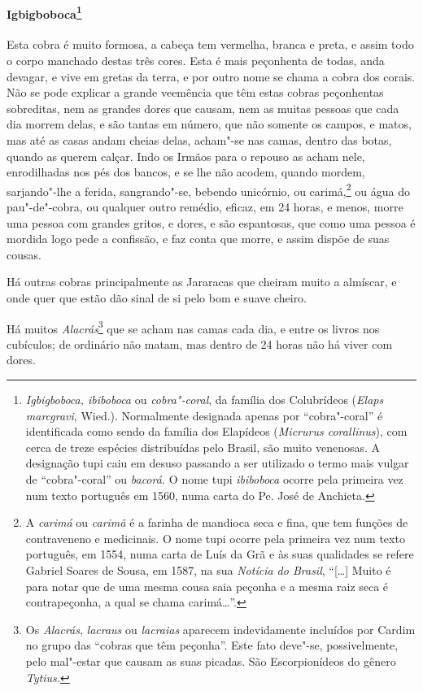 \paragraph{Igbigboboca\footnote{ \textit{Igbigboboca, ibiboboca} ou
\textit{cobra"-coral}, da família dos Colubrídeos (\textit{Elaps
marcgravi}, Wied.). Normalmente designada apenas por ``cobra"-coral'' é
identificada como sendo da família dos Elapídeos (\textit{Micrurus
corallinus}), com cerca de treze espécies distribuídas pelo Brasil, são
muito venenosas. A designação tupi caiu em desuso passando a ser
utilizado o termo mais vulgar de ``cobra"-coral'' ou \textit{bacorá.} O
nome tupi \textit{ibiboboca} ocorre pela primeira vez num texto
português em 1560, numa carta do Pe. José de
Anchieta.}} Esta cobra é muito formosa, a cabeça tem vermelha,
branca e preta, e assim todo o corpo manchado destas três cores. Esta é
mais peçonhenta de todas, anda devagar, e vive em gretas da terra, e
por outro nome se chama a cobra dos corais. Não se pode explicar a
grande veemência que têm estas cobras peçonhentas sobreditas, nem as
grandes dores que causam, nem as muitas pessoas que cada dia morrem
delas, e são tantas em número, que não somente os campos, e matos, mas
até as casas andam cheias delas, acham"-se nas camas, dentro das botas,
quando as querem calçar. Indo os Irmãos para o repouso as acham nele,
enrodilhadas nos pés dos bancos, e se lhe não acodem, quando mordem,
sarjando"-lhe a ferida, sangrando"-se, bebendo unicórnio, ou carimá,\footnote{ A 
\textit{carimá} ou \textit{carimã} é a farinha de mandioca
seca e fina, que tem funções de contraveneno e medicinais. O nome tupi
ocorre pela primeira vez num texto português, em 1554, numa carta
de Luís da Grã e às suas qualidades se refere Gabriel Soares de Sousa,
em 1587, na sua \textit{Notícia do Brasil}, ``[\ldots{}] Muito é para notar
que de uma mesma cousa saia peçonha e a mesma raiz seca é
contrapeçonha, a qual se chama carimá\ldots{}''.} ou água do pau"-de"-cobra,
ou qualquer outro remédio, eficaz, em 24 horas, e menos, morre uma
pessoa com grandes gritos, e dores, e são espantosas, que como uma
pessoa é mordida logo pede a confissão, e faz conta que morre, e assim
dispõe de suas cousas.

 Há outras cobras principalmente as Jararacas que cheiram muito a
almíscar, e onde quer que estão dão sinal de si pelo bom e suave cheiro.

 Há muitos \textit{Alacrás}\footnote{ Os \textit{Alacrás},
\textit{lacraus} ou \textit{lacraias} aparecem indevidamente incluídos por Cardim no grupo
das ``cobras que têm peçonha''. Este fato deve"-se, possivelmente, pelo
mal"-estar que causam as suas picadas. São Escorpionídeos do gênero
\textit{Tytius.}} que se acham nas camas cada dia, e entre os livros
nos cubículos; de ordinário não matam, mas dentro de 24 horas não há
viver com dores.

